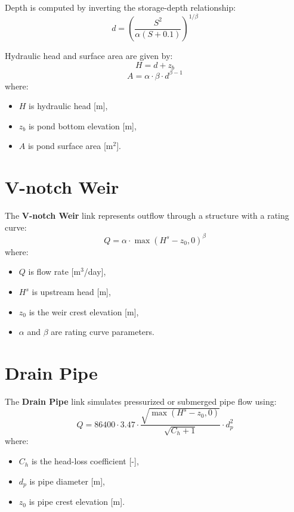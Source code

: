 \documentclass[12pt]{report}
\begin{document}
Depth is computed by inverting the storage-depth relationship:
\begin{equation}
d = \left( \frac{S^2}{\alpha(S+0.1)} \right)^{1/\beta}
\end{equation}

Hydraulic head and surface area are given by:
\begin{equation}
H = d + z_b
\end{equation}
\begin{equation}
A = \alpha \cdot \beta \cdot d^{\beta-1}
\end{equation}
where:
\begin{itemize}
  \item $H$ is hydraulic head [m],
  \item $z_b$ is pond bottom elevation [m],
  \item $A$ is pond surface area [m$^2$].
\end{itemize}

\section{V-notch Weir}

The \textbf{V-notch Weir} link represents outflow through a structure with a rating curve:
\begin{equation}
Q = \alpha \cdot \max(H^s - z_0, 0)^{\beta}
\end{equation}
where:
\begin{itemize}
  \item $Q$ is flow rate [m$^3$/day],
  \item $H^s$ is upstream head [m],
  \item $z_0$ is the weir crest elevation [m],
  \item $\alpha$ and $\beta$ are rating curve parameters.
\end{itemize}

\section{Drain Pipe}

The \textbf{Drain Pipe} link simulates pressurized or submerged pipe flow using:
\begin{equation}
Q = 86400 \cdot 3.47 \cdot \frac{\sqrt{\max(H^s - z_0, 0)}}{\sqrt{C_h + 1}} \cdot d_p^2
\end{equation}
where:
\begin{itemize}
  \item $C_h$ is the head-loss coefficient [-],
  \item $d_p$ is pipe diameter [m],
  \item $z_0$ is pipe crest elevation [m].
\end{itemize}
\end{document}
